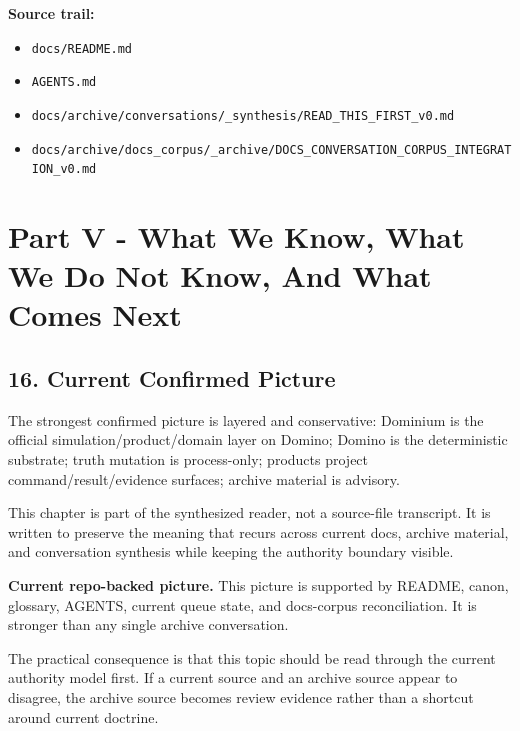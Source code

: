 \documentclass[10.5pt,a4paper,openany]{book}
\begin{document}
\textbf{Source trail:}


\begin{itemize}
\item \texttt{docs/\allowbreak{}README.\allowbreak{}md}
\item \texttt{AGENTS.\allowbreak{}md}
\item \texttt{docs/\allowbreak{}archive/\allowbreak{}conversations/\allowbreak{}\_\allowbreak{}synthesis/\allowbreak{}READ\_\allowbreak{}THIS\_\allowbreak{}FIRST\_\allowbreak{}v0.\allowbreak{}md}
\item \texttt{docs/\allowbreak{}archive/\allowbreak{}docs\_\allowbreak{}corpus/\allowbreak{}\_\allowbreak{}archive/\allowbreak{}DOCS\_\allowbreak{}CONVERSATION\_\allowbreak{}CORPUS\_\allowbreak{}INTEGRATION\_\allowbreak{}v0.\allowbreak{}md}
\end{itemize}


\chapter{Part V - What We Know, What We Do Not Know, And What Comes Next}


\section{16. Current Confirmed Picture}

The strongest confirmed picture is layered and conservative: Dominium is the official simulation/\allowbreak{}product/\allowbreak{}domain layer on Domino; Domino is the deterministic substrate; truth mutation is process-\allowbreak{}only; products project command/\allowbreak{}result/\allowbreak{}evidence surfaces; archive material is advisory.\allowbreak{}


This chapter is part of the synthesized reader, not a source-\allowbreak{}file transcript.\allowbreak{} It is written to preserve the meaning that recurs across current docs, archive material, and conversation synthesis while keeping the authority boundary visible.\allowbreak{}


\textbf{Current repo-backed picture.} This picture is supported by README, canon, glossary, AGENTS, current queue state, and docs-\allowbreak{}corpus reconciliation.\allowbreak{} It is stronger than any single archive conversation.\allowbreak{}


The practical consequence is that this topic should be read through the current authority model first.\allowbreak{} If a current source and an archive source appear to disagree, the archive source becomes review evidence rather than a shortcut around current doctrine.\allowbreak{}
\end{document}
